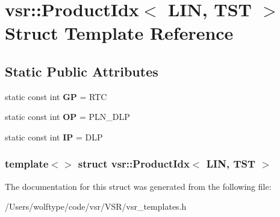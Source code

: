 \hypertarget{structvsr_1_1_product_idx_3_01_l_i_n_00_01_t_s_t_01_4}{\section{vsr\-:\-:Product\-Idx$<$ L\-I\-N, T\-S\-T $>$ Struct Template Reference}
\label{structvsr_1_1_product_idx_3_01_l_i_n_00_01_t_s_t_01_4}
}
\subsection*{Static Public Attributes}
\begin{DoxyCompactItemize}
\item 
\hypertarget{structvsr_1_1_product_idx_3_01_l_i_n_00_01_t_s_t_01_4_aae87a8b73fff99459f25cab0c8f59442}{static const int {\bfseries G\-P} = R\-T\-C}\label{structvsr_1_1_product_idx_3_01_l_i_n_00_01_t_s_t_01_4_aae87a8b73fff99459f25cab0c8f59442}

\item 
\hypertarget{structvsr_1_1_product_idx_3_01_l_i_n_00_01_t_s_t_01_4_a847f8a8435e459e310bd9784c72461c2}{static const int {\bfseries O\-P} = P\-L\-N\-\_\-\-D\-L\-P}\label{structvsr_1_1_product_idx_3_01_l_i_n_00_01_t_s_t_01_4_a847f8a8435e459e310bd9784c72461c2}

\item 
\hypertarget{structvsr_1_1_product_idx_3_01_l_i_n_00_01_t_s_t_01_4_ab6c638805c416bac6f519faa2dc8b072}{static const int {\bfseries I\-P} = D\-L\-P}\label{structvsr_1_1_product_idx_3_01_l_i_n_00_01_t_s_t_01_4_ab6c638805c416bac6f519faa2dc8b072}

\end{DoxyCompactItemize}
\subsubsection*{template$<$$>$ struct vsr\-::\-Product\-Idx$<$ L\-I\-N, T\-S\-T $>$}



The documentation for this struct was generated from the following file\-:\begin{DoxyCompactItemize}
\item 
/\-Users/wolftype/code/vsr/\-V\-S\-R/vsr\-\_\-templates.\-h\end{DoxyCompactItemize}
